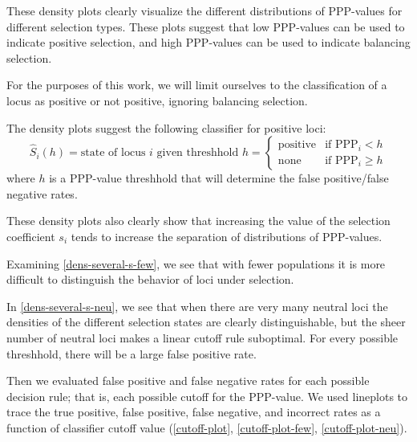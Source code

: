 \documentclass[a4paper,12pt]{article}
\begin{document}

These density plots clearly visualize the different distributions of
PPP-values for different selection types. These plots suggest that low
PPP-values can be used to indicate positive selection, and high
PPP-values can be used to indicate balancing selection.

For the purposes of this work, we will limit ourselves to the
classification of a locus as positive or not positive, ignoring
balancing selection.

The density plots suggest the following classifier for positive loci:
$$\hat{S}_{i}(h)=\text{state of locus $i$ given threshhold $h$} = 
\begin{cases}
  \text{positive} & \text{if PPP}_i<h\\
  \text{none}     & \text{if PPP}_i\geq h
\end{cases}
$$
where $h$ is a PPP-value threshhold that will determine the false
positive/false negative rates.

These density plots also clearly show that increasing the value of the
selection coefficient $s_i$ tends to increase the separation of
distributions of PPP-values.

Examining \autoref{dens-several-s-few}, we see that with fewer
populations it is more difficult to distinguish the behavior of loci
under selection.

In \autoref{dens-several-s-neu}, we see that when there are very many
neutral loci the densities of the different selection states are
clearly distinguishable, but the sheer number of neutral loci makes a
linear cutoff rule suboptimal. For every possible threshhold, there
will be a large false positive rate.

Then we evaluated false positive and false negative rates for each
possible decision rule; that is, each possible cutoff for the
PPP-value. We used lineplots to trace the true positive, false
positive, false negative, and incorrect rates as a function of
classifier cutoff value (\autoref{cutoff-plot},
\autoref{cutoff-plot-few}, \autoref{cutoff-plot-neu}).

\end{document}
